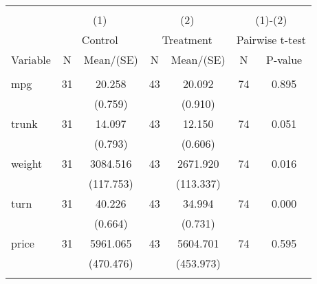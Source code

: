 
\begin{tabular}{@{\extracolsep{5pt}}lcccccc}
\\[-1.8ex]\hline \hline \\[-1.8ex]
 & \multicolumn{2}{c}{(1)}  & \multicolumn{2}{c}{(2)}  & \multicolumn{2}{c}{(1)-(2)} \\
 & \multicolumn{2}{c}{Control}  & \multicolumn{2}{c}{Treatment}  & \multicolumn{2}{c}{Pairwise t-test}  \\
Variable & N & Mean/(SE) & N & Mean/(SE) & N & P-value \\ \hline \\[-1.8ex] 
mpg   & 31    & 20.258    & 43    & 20.092    & 74    & 0.895   \\
 &   & (0.759)  &   & (0.910)  &   &  \\ [1ex]
trunk   & 31    & 14.097    & 43    & 12.150    & 74    & 0.051   \\
 &   & (0.793)  &   & (0.606)  &   &  \\ [1ex]
weight   & 31    & 3084.516    & 43    & 2671.920    & 74    & 0.016   \\
 &   & (117.753)  &   & (113.337)  &   &  \\ [1ex]
turn   & 31    & 40.226    & 43    & 34.994    & 74    & 0.000   \\
 &   & (0.664)  &   & (0.731)  &   &  \\ [1ex]
price   & 31    & 5961.065    & 43    & 5604.701    & 74    & 0.595   \\
 &   & (470.476)  &   & (453.973)  &   &  \\ [1ex]
\hline \hline \\[-1.8ex]

\end{tabular}
